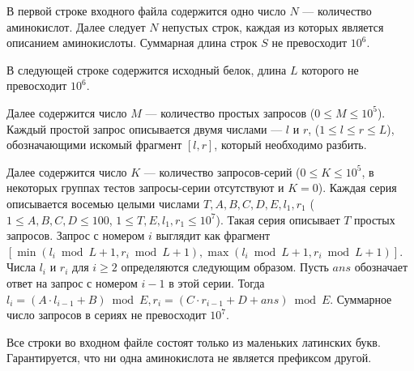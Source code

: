 В первой строке входного файла содержится одно число $N$ --- количество аминокислот. Далее следует $N$ непустых строк, каждая из которых является описанием аминокислоты. Суммарная длина строк $S$ не превосходит $10^6$.

В следующей строке содержится исходный белок, длина $L$ которого не превосходит $10^6$.

Далее содержится число $M$ --- количество простых запросов ($0 \leqslant M \leqslant 10^5$). Каждый простой запрос описывается двумя числами --- $l$ и $r$, ($1 \leqslant l \leqslant r \leqslant L$), обозначающими искомый фрагмент $[l, r]$, который необходимо разбить.

Далее содержится число $K$ --- количество запросов-серий ($0 \leqslant K \leqslant 10^5$, в некоторых группах тестов запросы-серии отсутствуют и $K=0$). Каждая серия описывается восемью целыми числами $T, A, B, C, D, E, l_1, r_1$ ($1 \leqslant A, B, C, D \leqslant 100$, $1 \leqslant T, E, l_1, r_1 \leqslant 10^7$). Такая серия описывает $T$ простых запросов. Запрос с номером $i$ выглядит как фрагмент $[\min(l_i \bmod L + 1, r_i \bmod L + 1), \max(l_i \bmod L + 1, r_i \bmod L + 1)]$. Числа $l_i$ и $r_i$ для $i \geqslant 2$ определяются следующим образом. Пусть $ans$ обозначает ответ на запрос с номером $i-1$ в этой серии. Тогда $l_i = (A \cdot l_{i-1} + B) \bmod E, r_i = (C \cdot r_{i-1} + D + ans) \bmod E$. Суммарное число запросов в сериях не превосходит $10^7$.

Все строки во входном файле состоят только из маленьких латинских букв. Гарантируется, что ни одна аминокислота не является префиксом другой.